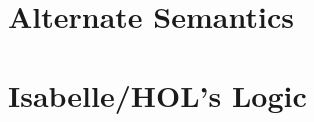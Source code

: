 \documentclass[11pt]{article}
\numberwithin{equation}{subsection}
\begin{document}
\appendix
\section{Alternate Semantics}


\section{Isabelle/HOL's Logic}

\pagebreak
{}


\end{document}
